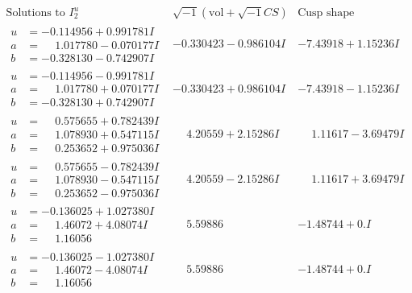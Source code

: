 \documentclass[1p]{elsarticle_modified}
\theoremstyle{definition}
\newcommand{\I}{\sqrt{-1}}
\begin{document}
$$\begin{array}{c|c|c}  
\text{Solutions to }I^u_{2}& \I (\text{vol} + \sqrt{-1}CS) & \text{Cusp shape}\\
 \hline 
\begin{aligned}
u &= -0.114956 + 0.991781 I \\
a &= \phantom{-}1.017780 - 0.070177 I \\
b &= -0.328130 - 0.742907 I\end{aligned}
 & -0.330423 - 0.986104 I & -7.43918 + 1.15236 I \\ \hline\begin{aligned}
u &= -0.114956 - 0.991781 I \\
a &= \phantom{-}1.017780 + 0.070177 I \\
b &= -0.328130 + 0.742907 I\end{aligned}
 & -0.330423 + 0.986104 I & -7.43918 - 1.15236 I \\ \hline\begin{aligned}
u &= \phantom{-}0.575655 + 0.782439 I \\
a &= \phantom{-}1.078930 + 0.547115 I \\
b &= \phantom{-}0.253652 + 0.975036 I\end{aligned}
 & \phantom{-}4.20559 + 2.15286 I & \phantom{-}1.11617 - 3.69479 I \\ \hline\begin{aligned}
u &= \phantom{-}0.575655 - 0.782439 I \\
a &= \phantom{-}1.078930 - 0.547115 I \\
b &= \phantom{-}0.253652 - 0.975036 I\end{aligned}
 & \phantom{-}4.20559 - 2.15286 I & \phantom{-}1.11617 + 3.69479 I \\ \hline\begin{aligned}
u &= -0.136025 + 1.027380 I \\
a &= \phantom{-}1.46072 + 4.08074 I \\
b &= \phantom{-}1.16056\phantom{ +0.000000I}\end{aligned}
 & \phantom{-}5.59886\phantom{ +0.000000I} & -1.48744 + 0. I\phantom{ +0.000000I} \\ \hline\begin{aligned}
u &= -0.136025 - 1.027380 I \\
a &= \phantom{-}1.46072 - 4.08074 I \\
b &= \phantom{-}1.16056\phantom{ +0.000000I}\end{aligned}
 & \phantom{-}5.59886\phantom{ +0.000000I} & -1.48744 + 0. I\phantom{ +0.000000I} \\ \hline\begin{aligned}

\end{aligned}
\end{array}$$
\end{document}
